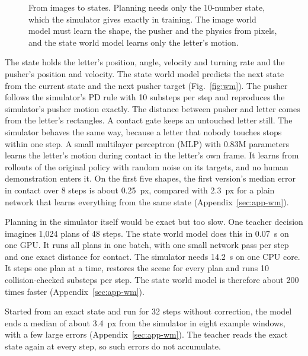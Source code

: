 \documentclass[10pt,twocolumn,letterpaper]{article}
\begin{document}
\begin{figure}[t]
  \centering
  {\def\presroot{../}}
  \caption{From images to states. Planning needs only the 10-number state, which the simulator gives exactly in
  training. The image world model must learn the shape, the pusher and the physics from pixels, and the state world
  model learns only the letter's motion.}
  \label{fig:img2state}
\end{figure}

The state holds the letter's position, angle, velocity and turning rate and the pusher's position and velocity. The
state world model predicts the next state from the current state and the next pusher target (Fig.~\ref{fig:wm}). The
pusher follows the simulator's PD rule with 10 substeps per step and reproduces the simulator's pusher motion exactly.
The distance between pusher and letter comes from the letter's rectangles. A contact gate keeps an untouched letter
still. The simulator behaves the same way, because a letter that nobody touches stops within one step. A small
multilayer perceptron (MLP) with 0.83M parameters learns the letter's motion during contact in the letter's own frame.
It learns from rollouts of the original policy with random noise on its targets, and no human demonstration enters it.
On the first five shapes, the first version's median error in contact over 8 steps is about 0.25~px, compared with
2.3~px for a plain network that learns everything from the same state (Appendix~\ref{sec:app-wm}).

Planning in the simulator itself would be exact but too slow. One teacher decision imagines 1,024 plans of 48 steps.
The state world model does this in 0.07~s on one GPU. It runs all plans in one batch, with one small network pass per
step and one exact distance for contact. The simulator needs 14.2~s on one CPU core. It steps one plan at a time,
restores the scene for every plan and runs 10 collision-checked substeps per step. The state world model is therefore
about 200 times faster (Appendix~\ref{sec:app-wm}). %

Started from an exact state and run for 32 steps without correction, the model ends a median of about 3.4~px from the
simulator in eight example windows, with a few large errors (Appendix~\ref{sec:app-wm}). The teacher reads the exact
state again at every step, so such errors do not accumulate. %
\end{document}
